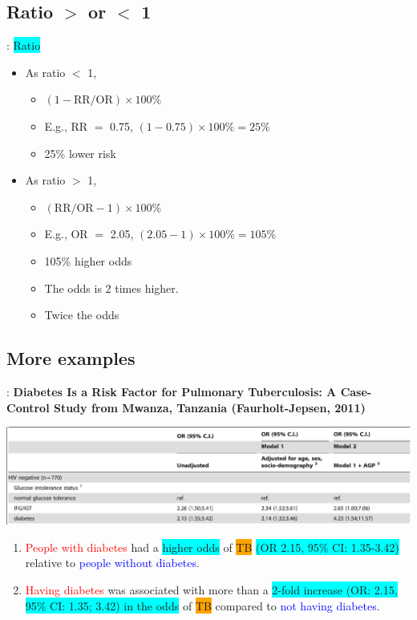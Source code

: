 \subsection{Ratio $>$ or $<$ 1}
\begin{frame}{\secname: \subsecname}
\colorbox{cyan}{Ratio}
\begin{itemize}
\item<2|handout:2-> As ratio $<$ 1, 
	\begin{itemize}
			\item $(1-\text{RR}/\text{OR}) \times 100\% $
			\item E.g., RR $=$ 0.75, $(1-0.75) \times 100\% = 25\% $
			\item 25\% lower risk
	\end{itemize}
\item<3|handout:3> As ratio $>$ 1, 
	\begin{itemize}
			\item $(\text{RR}/\text{OR} - 1) \times 100\% $
			\item E.g., OR $=$ 2.05, $(2.05 - 1) \times 100\% = 105\% $
			\item 105\% higher odds
			\item The odds is 2 times higher.
			\item Twice the odds
	\end{itemize}

\end{itemize}
\end{frame}

\subsection{More examples}
\begin{frame}{\secname: \subsecname}
\footnotesize \textbf{Diabetes Is a Risk Factor for Pulmonary Tuberculosis: A Case-Control Study from Mwanza, Tanzania (Faurholt-Jepsen, 2011)}
\vspace{-3mm}
\begin{center}
\includegraphics[scale=0.35]{image/dm_tb.png}
\end{center}
\begin{enumerate}
    \item<2|handout:2-> \textcolor{red}{People with diabetes} had a \colorbox{cyan}{higher odds} of \colorbox{orange}{TB} \colorbox{cyan}{(OR 2.15, 95\% CI: 1.35-3.42)} relative to \textcolor{blue}{people without diabetes}.
    \item<3|handout:3> \textcolor{red}{Having diabetes} was associated with more than a \colorbox{cyan}{2-fold increase (OR: 2.15, 95\% CI: 1.35; 3.42) in the odds} of \colorbox{orange}{TB} compared to \textcolor{blue}{not having diabetes}.
\end{enumerate}
\end{frame}

